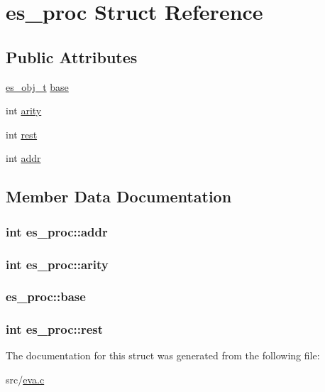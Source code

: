\hypertarget{structes__proc}{\section{es\-\_\-proc Struct Reference}
\label{structes__proc}
}
\subsection*{Public Attributes}
\begin{DoxyCompactItemize}
\item 
\hyperlink{eva_8h_a3370a89a85f5ff467ca5e7dba47e63bc}{es\-\_\-obj\-\_\-t} \hyperlink{structes__proc_aaec389707aa3ba3da8029fbd5d48838f}{base}
\item 
int \hyperlink{structes__proc_aec81132e4ec4163a318c1340af0786a3}{arity}
\item 
int \hyperlink{structes__proc_a83367139dbc70c9dd36968127afb253d}{rest}
\item 
int \hyperlink{structes__proc_adac071bcba427a9140ceaf8a62d45d62}{addr}
\end{DoxyCompactItemize}


\subsection{Member Data Documentation}
\hypertarget{structes__proc_adac071bcba427a9140ceaf8a62d45d62}{
\subsubsection[{addr}]{\setlength{\rightskip}{0pt plus 5cm}int es\-\_\-proc\-::addr}}\label{structes__proc_adac071bcba427a9140ceaf8a62d45d62}
\hypertarget{structes__proc_aec81132e4ec4163a318c1340af0786a3}{
\subsubsection[{arity}]{\setlength{\rightskip}{0pt plus 5cm}int es\-\_\-proc\-::arity}}\label{structes__proc_aec81132e4ec4163a318c1340af0786a3}
\hypertarget{structes__proc_aaec389707aa3ba3da8029fbd5d48838f}{
\subsubsection[{base}]{ es\-\_\-proc\-::base}}\label{structes__proc_aaec389707aa3ba3da8029fbd5d48838f}
\hypertarget{structes__proc_a83367139dbc70c9dd36968127afb253d}{
\subsubsection[{rest}]{\setlength{\rightskip}{0pt plus 5cm}int es\-\_\-proc\-::rest}}\label{structes__proc_a83367139dbc70c9dd36968127afb253d}


The documentation for this struct was generated from the following file\-:\begin{DoxyCompactItemize}
\item 
src/\hyperlink{eva_8c}{eva.\-c}\end{DoxyCompactItemize}
